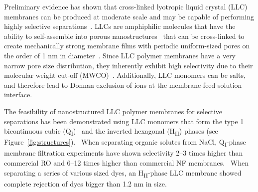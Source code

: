 \documentclass{article}
\begin{document}
  Preliminary evidence has shown that cross-linked lyotropic liquid crystal
  (LLC) membranes can be produced at moderate scale and may be capable of 
  performing highly selective separations~\cite{zhou_supported_2005,zhou_new_2007}. 
  LLCs are amphiphilic molecules that have the ability to self-assemble into
  porous nanostructures~\cite{smith_ordered_1997} that can be cross-linked 
  to create mechanically strong membrane films with periodic uniform-sized
  pores on the order of 1 nm in diameter~\cite{zhou_supported_2005}. 
  Since LLC polymer membranes have a very narrow pore size distribution, they 
  inherently exhibit high selectivity due to their molecular weight cut-off 
  (MWCO)~\cite{zhou_supported_2005}. Additionally, LLC monomers can be salts,
  and therefore lead to Donnan exclusion of ions at the membrane-feed solution 
  interface.\cite{donnan_theory_1995}

  The feasibility of nanostructured LLC polymer membranes for selective 
  separations has been demonstrated using LLC monomers that form the type
  1 bicontinuous cubic (Q\textsubscript{I})~\cite{hatakeyama_water_2011,hatakeyama_nanoporous_2010,carter_glycerol-based_2012}
  and the inverted hexagonal (H\textsubscript{II}) phases (see 
  Figure~\ref{fig:structures}).~\cite{zhou_supported_2005} When separating
  organic solutes from NaCl, Q\textsubscript{I}-phase membrane filtration 
  experiments have shown selectivity 2--3 times higher than commercial RO
  and 6--12 times higher than commercial NF membranes.~\cite{dischinger_application_2017}
  When separating a series of various sized dyes, an H\textsubscript{II}-phase 
  LLC membrane showed complete rejection of dyes bigger than 1.2 nm in size.~\cite{zhou_supported_2005}

\end{document}
